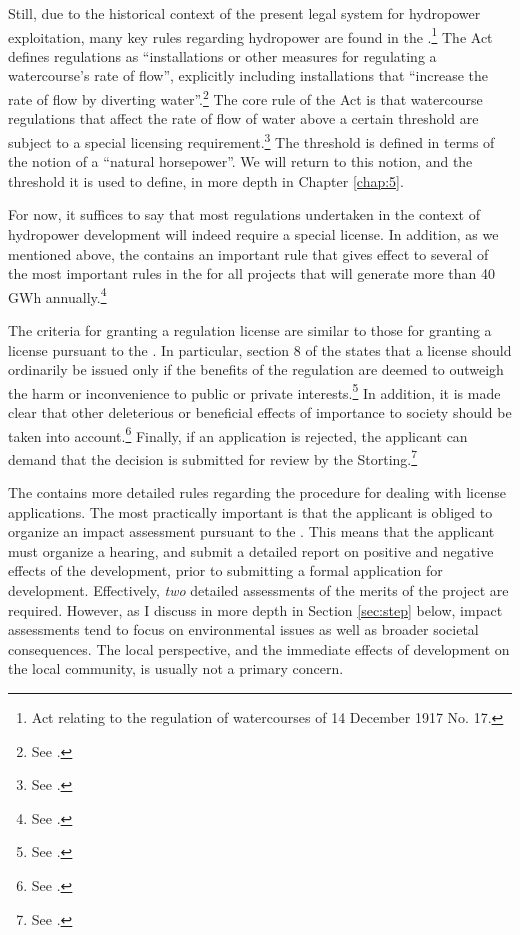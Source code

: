 Still, due to the historical context of the present legal system for hydropower exploitation, many key rules regarding hydropower are found in the \cite{wra17}.\footnote{Act relating to the regulation of watercourses of 14 December 1917 No. 17.} The Act defines regulations as ``installations or other measures for regulating a watercourse's rate of flow'', explicitly including installations that ``increase the rate of flow by diverting water''.\footnote{See \cite[1]{wra17}.} The core rule of the Act is that watercourse regulations that affect the rate of flow of water above a certain threshold are subject to a special licensing requirement.\footnote{See \cite[2]{wra17}.} The threshold is defined in terms of the notion of a ``natural horsepower''. We will return to this notion, and the threshold it is used to define, in more depth in Chapter \ref{chap:5}. 

For now, it suffices to say that most regulations undertaken in the context of hydropower development will indeed require a special license. In addition, as we mentioned above, the \cite{wra00} contains an important rule that gives effect to several of the most important rules in the \cite{wra17} for all projects that will generate more than 40 GWh annually.\footnote{See \cite[19]{wra00}.}

The criteria for granting a regulation license are similar to those for granting a license pursuant to the \cite{wra00}. In particular, section 8 of the \cite{wra17} states that a license should ordinarily be issued only if the benefits of the regulation are deemed to outweigh the harm or inconvenience to public or private interests.\footnote{See \cite[8]{wra17}.} In addition, it is made clear that other deleterious or beneficial effects of importance to society should be taken into account.\footnote{See \cite[8]{wra17}.} Finally, if an application is rejected, the applicant can demand that the decision is submitted for review by the Storting.\footnote{See \cite[8]{wra17}.}

The \cite{wra17} contains more detailed rules regarding the procedure for dealing with license applications. The most practically important is that the applicant is obliged to organize an impact assessment pursuant to the \cite{pba..}. This means that the applicant must organize a hearing, and submit a detailed report on positive and negative effects of the development, prior to submitting a formal application for development. Effectively, {\it two} detailed assessments of the merits of the project are required. However, as I discuss in more depth in Section \ref{sec:step} below, impact assessments tend to focus on environmental  issues as well as broader societal consequences. The local perspective, and the immediate effects of development on the local community, is usually not a primary concern.

